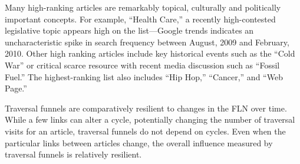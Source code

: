 Many high-ranking articles are remarkably topical, culturally and politically important concepts.  For example, ``Health Care,'' a recently high-contested legislative topic appears high on the list---Google trends indicates an uncharacteristic spike in search frequency between August, 2009 and February, 2010.
Other high ranking articles include key historical events such as the ``Cold War'' or critical scarce resource with recent 
media discussion such as ``Fossil Fuel.'' 
The highest-ranking list also includes ``Hip Hop,'' ``Cancer,'' and ``Web Page.''

Traversal funnels are comparatively resilient to changes in the FLN over time. While a few links can alter a cycle, potentially changing the number of traversal visits for an article, traversal funnels do not depend on cycles. Even when the particular links between articles change, the overall influence measured by traversal funnels is relatively resilient. 

